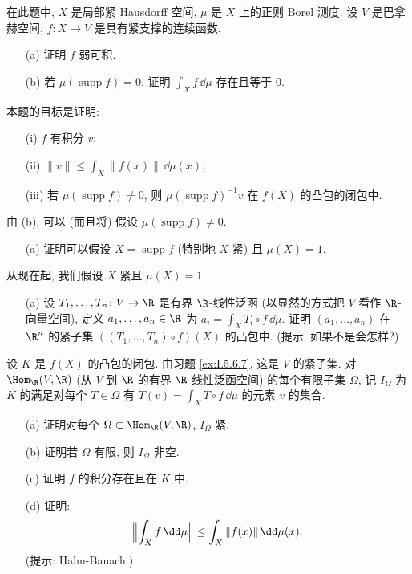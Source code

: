 \begin{exercise}[紧支撑连续函数的积分]
\label{ex:I.5.6.2}
在此题中, $X$ 是局部紧 Hausdorff 空间, $\mu$ 是 $X$ 上的正则 Borel 测度. 设 $V$ 是巴拿赫空间, $f \colon X \to V$ 是具有紧支撑的连续函数.
\begin{enumerate}
\item[(a)] 证明 $f$ 弱可积.
\item[(b)] 若 $\mu(\operatorname{supp} f) = 0$, 证明 $\int_X f\,\dd\mu$ 存在且等于 $0$.
\end{enumerate}
本题的目标是证明:
\begin{enumerate}
\item[(i)] $f$ 有积分 $v$;
\item[(ii)] $\|v\| \leq \int_X \|f(x)\|\,\dd\mu(x)$;
\item[(iii)] 若 $\mu(\operatorname{supp} f) \neq 0$, 则 $\mu(\operatorname{supp} f)^{-1}v$ 在 $f(X)$ 的凸包的闭包中.
\end{enumerate}
由 (b), 可以 (而且将) 假设 $\mu(\operatorname{supp} f) \neq 0$.
\begin{enumerate}
\item[(a)] 证明可以假设 $X = \operatorname{supp} f$ (特别地 $X$ 紧) 且 $\mu(X) = 1$.
\end{enumerate}
从现在起, 我们假设 $X$ 紧且 $\mu(X) = 1$.
\begin{enumerate}
\item[(a)] 设 $T_1, \ldots, T_n \colon V \to \R$ 是有界 $\R$-线性泛函 (以显然的方式把 $V$ 看作 $\R$-向量空间), 定义 $a_1, \ldots, a_n \in \R$ 为 $a_i = \int_X T_i \circ f\,\dd\mu$. 证明 $(a_1, \ldots, a_n)$ 在 $\R^n$ 的紧子集 $((T_1, \ldots, T_n) \circ f)(X)$ 的凸包中. (提示: 如果不是会怎样?)
\end{enumerate}
设 $K$ 是 $f(X)$ 的凸包的闭包. 由习题 \ref{ex:I.5.6.7}, 这是 $V$ 的紧子集. 对 $\Hom_{\R}(V, \R)$ (从 $V$ 到 $\R$ 的有界 $\R$-线性泛函空间) 的每个有限子集 $\Omega$, 记 $I_{\Omega}$ 为 $K$ 的满足对每个 $T \in \Omega$ 有 $T(v) = \int_X T \circ f\,\dd\mu$ 的元素 $v$ 的集合.
\begin{enumerate}
\item[(a)] 证明对每个 $\Omega \subset \Hom_{\R}(V, \R)$, $I_{\Omega}$ 紧.
\item[(b)] 证明若 $\Omega$ 有限, 则 $I_{\Omega}$ 非空.
\item[(c)] 证明 $f$ 的积分存在且在 $K$ 中.
\item[(d)] 证明:
\[
\Bigl\|\int_X f\,\dd\mu\Bigr\| \leq \int_X \|f(x)\|\,\dd\mu(x).
\]
(提示: Hahn-Banach.)
\end{enumerate}
\end{exercise}


